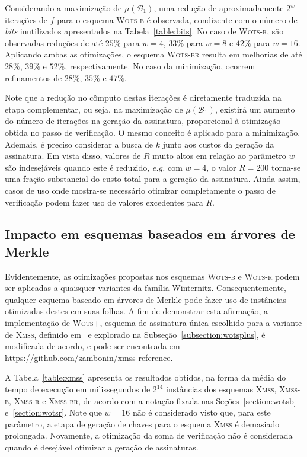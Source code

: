 \documentclass{ufsctex/ufsctex}
\newcommand{\bone}{\mathcal{B}_{1}}
\newcommand{\wotsplus}{\textsc{Wots+}}
\newcommand{\wotsb}{\textsc{Wots-b}}
\newcommand{\wotsr}{\textsc{Wots-r}}
\newcommand{\wotsbr}{\textsc{Wots-br}}
\newcommand{\xmss}{\textsc{Xmss}}
\newcommand{\xmssb}{\textsc{Xmss-b}}
\newcommand{\xmssr}{\textsc{Xmss-r}}
\newcommand{\xmssbr}{\textsc{Xmss-br}}
\begin{document}
Considerando a maximização de $\mu(\bone{})$, uma redução de aproximadamente
$2^{w}$ iterações de $f$ para o esquema \wotsb{} é observada, condizente com o
número de \emph{bits} inutilizados apresentados na Tabela~\ref{table:bits}. No
caso de \wotsr{}, são observadas reduções de até $25\%$ para $w = 4$, $33\%$
para $w = 8$ e $42\%$ para $w = 16$. Aplicando ambas as otimizações, o esquema
\wotsbr{} resulta em melhorias de até $28\%$, $39\%$ e $52\%$, respectivamente.
No caso da minimização, ocorrem refinamentos de $28\%$, $35\%$ e $47\%$.

Note que a redução no cômputo destas iterações é diretamente traduzida na etapa
complementar, ou seja, na maximização de $\mu(\bone{})$, existirá um aumento do
número de iterações na geração da assinatura, proporcional à otimização obtida
no passo de verificação. O mesmo conceito é aplicado para a minimização.
Ademais, é preciso considerar a busca de $k$ junto aos custos da
geração da assinatura. Em vista disso, valores de $R$ muito altos em relação ao
parâmetro $w$ são indesejáveis quando este é reduzido, \emph{e.g.} com $w = 4$,
o valor $R = 200$ torna-se uma fração substancial do custo total para a geração
da assinatura. Ainda assim, casos de uso onde mostra-se necessário otimizar
completamente o passo de verificação podem fazer uso de valores excedentes para
$R$.

\subsection{Impacto em esquemas baseados
  em árvores de Merkle}\label{subsection:impact}

Evidentemente, as otimizações propostas nos esquemas \wotsb{} e \wotsr{} podem
ser aplicadas a quaisquer variantes da família Winternitz. Consequentemente,
qualquer esquema baseado em árvores de Merkle pode fazer uso de instâncias
otimizadas destes em suas folhas. A fim de demonstrar esta afirmação, a
implementação de \wotsplus{}, esquema de assinatura única escolhido para a
variante de \xmss{}, definido em~\cite[Seção 3.1]{Huelsing:report:2018:may} e
explorado na Subseção~\ref{subsection:wotsplus}, é modificada de acordo, e pode
ser encontrada em \url{https://github.com/zambonin/xmss-reference}.

A Tabela~\ref{table:xmss} apresenta os resultados obtidos, na forma da média do
tempo de execução em milissegundos de $2^{14}$ instâncias dos esquemas \xmss{},
\xmssb{}, \xmssr{} e \xmssbr{}, de acordo com a notação fixada nas
Seções~\ref{section:wotsb} e~\ref{section:wotsr}. Note que $w = 16$ não é
considerado visto que, para este parâmetro, a etapa de geração de chaves para o
esquema \xmss{} é demasiado prolongada. Novamente, a otimização da soma de
verificação não é considerada quando é desejável otimizar a geração de
assinaturas.
\end{document}
